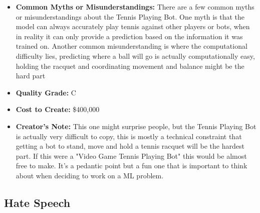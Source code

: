 \begin{itemize}
\begin{itemize}
    \item \textbf{Common Myths or Misunderstandings:} There are a few common myths or misunderstandings about the Tennis Playing Bot. One myth is that the model can always accurately play tennis against other players or bots, when in reality it can only provide a prediction based on the information it was trained on. Another common misunderstanding is where the computational difficulty lies, predicting where a ball will go is actually computationally easy, holding the racquet and coordinating movement and balance might be the hard part 
    \item \textbf{Quality Grade:} C
    \item \textbf{Cost to Create:} \$400,000
    \item \textbf{Creator's Note:} This one might surprise people, but the Tennis Playing Bot is actually very difficult to copy, this is mostly a technical constraint that getting a bot to stand, move and hold a tennis racquet will be the hardest part. If this were a "Video Game Tennis Playing Bot" this would be almost free to make. It's a pedantic point but a fun one that is important to think about when deciding to work on a ML problem.
\end{itemize}


\subsection{Hate Speech}


\end{itemize}
